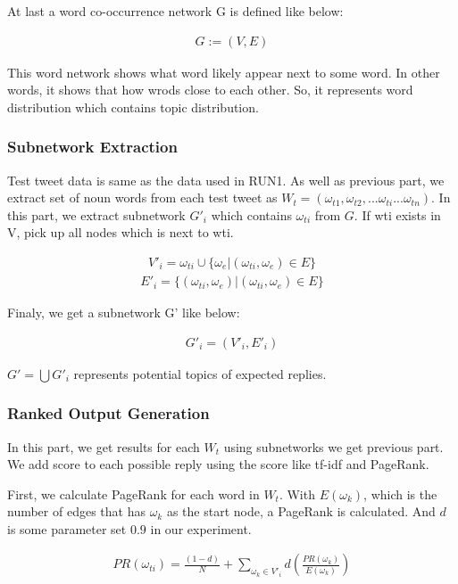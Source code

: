 \documentclass{../style/sig-alternate}
\begin{document}
At last a word co-occurrence network G is defined like below:

\begin{eqnarray}
G := (V,E)
\end{eqnarray}

This word network shows what word likely appear next to some word. In other words, it shows that how wrods close to each other. So, it represents word distribution which contains topic distribution.

\subsubsection{Subnetwork Extraction}
Test tweet data is same as the data used in RUN1. As well as previous part, we extract set of noun words from each test tweet as \(W_{t} = (\omega_{t1}, \omega_{t2}, ... \omega_{ti} ... \omega_{tn})\).
In this part, we extract subnetwork $G'_{i}$ which contains \(\omega_{ti}\) from $G$.
If wti exists in V, pick up all nodes which is next to wti.

\begin{eqnarray}V'_{i} = \omega_{ti} \cup \{\omega_{e} |  (\omega_{ti}, \omega_{e}) \in E\}\end{eqnarray}
\begin{eqnarray}E'_{i} = \{(\omega_{ti}, \omega_{e}) | (\omega_{ti}, \omega_{e}) \in E\} \end{eqnarray}

Finaly, we get a subnetwork G' like below:

\begin{eqnarray}G'_{i} = (V'_{i}, E'_{i})\end{eqnarray}

\(G' = \bigcup G'_{i}\) represents potential topics of expected replies.

\subsubsection{Ranked Output Generation}
In this part, we get results for each $W_{t}$ using subnetworks we get previous part. We add score to each possible reply using the score like tf-idf and PageRank\cite{PageRank}.

First, we calculate PageRank for each word in $W_{t}$. With $E(\omega_{k})$, which is the number of edges that has $\omega_{k}$ as the start node, a PageRank is calculated. And $d$ is some parameter set $0.9$ in our experiment.

\begin{eqnarray}PR(\omega_{ti}) = \frac{(1-d)}{N} + \sum_{\omega_{k}\in V'_{i}} d(\frac{PR(\omega_{k})}{E(\omega_{k})})\end{eqnarray}
\end{document}
